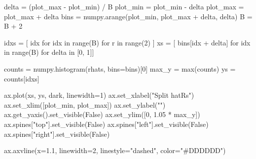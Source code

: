 \documentclass[
  letterpaper,
  DIV=11,
  numbers=noendperiod]{scrartcl}
\newenvironment{Shaded}{\begin{snugshade}}{\end{snugshade}}
\newcommand{\BuiltInTok}[1]{\textcolor[rgb]{0.00,0.23,0.31}{#1}}
\newcommand{\ControlFlowTok}[1]{\textcolor[rgb]{0.00,0.23,0.31}{#1}}
\newcommand{\DecValTok}[1]{\textcolor[rgb]{0.68,0.00,0.00}{#1}}
\newcommand{\FloatTok}[1]{\textcolor[rgb]{0.68,0.00,0.00}{#1}}
\newcommand{\KeywordTok}[1]{\textcolor[rgb]{0.00,0.23,0.31}{#1}}
\newcommand{\NormalTok}[1]{\textcolor[rgb]{0.00,0.23,0.31}{#1}}
\newcommand{\OperatorTok}[1]{\textcolor[rgb]{0.37,0.37,0.37}{#1}}
\newcommand{\StringTok}[1]{\textcolor[rgb]{0.13,0.47,0.30}{#1}}
\newcommand{\VariableTok}[1]{\textcolor[rgb]{0.07,0.07,0.07}{#1}}
\begin{document}
\begin{Shaded}
\begin{Highlighting}[]
\NormalTok{  delta }\OperatorTok{=}\NormalTok{ (plot\_max }\OperatorTok{{-}}\NormalTok{ plot\_min) }\OperatorTok{/}\NormalTok{ B}
\NormalTok{  plot\_min }\OperatorTok{=}\NormalTok{ plot\_min }\OperatorTok{{-}}\NormalTok{ delta}
\NormalTok{  plot\_max }\OperatorTok{=}\NormalTok{ plot\_max }\OperatorTok{+}\NormalTok{ delta}
\NormalTok{  bins }\OperatorTok{=}\NormalTok{ numpy.arange(plot\_min, plot\_max }\OperatorTok{+}\NormalTok{ delta, delta)}
\NormalTok{  B }\OperatorTok{=}\NormalTok{ B }\OperatorTok{+} \DecValTok{2}

\NormalTok{  idxs }\OperatorTok{=}\NormalTok{ [ idx }\ControlFlowTok{for}\NormalTok{ idx }\KeywordTok{in} \BuiltInTok{range}\NormalTok{(B) }\ControlFlowTok{for}\NormalTok{ r }\KeywordTok{in} \BuiltInTok{range}\NormalTok{(}\DecValTok{2}\NormalTok{) ]}
\NormalTok{  xs }\OperatorTok{=}\NormalTok{ [ bins[idx }\OperatorTok{+}\NormalTok{ delta] }\ControlFlowTok{for}\NormalTok{ idx }\KeywordTok{in} \BuiltInTok{range}\NormalTok{(B) }\ControlFlowTok{for}\NormalTok{ delta }\KeywordTok{in}\NormalTok{ [}\DecValTok{0}\NormalTok{, }\DecValTok{1}\NormalTok{]]}

\NormalTok{  counts }\OperatorTok{=}\NormalTok{ numpy.histogram(rhats, bins}\OperatorTok{=}\NormalTok{bins)[}\DecValTok{0}\NormalTok{]}
\NormalTok{  max\_y }\OperatorTok{=} \BuiltInTok{max}\NormalTok{(counts)}
\NormalTok{  ys }\OperatorTok{=}\NormalTok{ counts[idxs]}

\NormalTok{  ax.plot(xs, ys, dark, linewidth}\OperatorTok{=}\DecValTok{1}\NormalTok{)}
\NormalTok{  ax.set\_xlabel(}\StringTok{"Split hatRs"}\NormalTok{)}
\NormalTok{  ax.set\_xlim([plot\_min, plot\_max])}
\NormalTok{  ax.set\_ylabel(}\StringTok{""}\NormalTok{)}
\NormalTok{  ax.get\_yaxis().set\_visible(}\VariableTok{False}\NormalTok{)}
\NormalTok{  ax.set\_ylim([}\DecValTok{0}\NormalTok{, }\FloatTok{1.05} \OperatorTok{*}\NormalTok{ max\_y])}
\NormalTok{  ax.spines[}\StringTok{"top"}\NormalTok{].set\_visible(}\VariableTok{False}\NormalTok{)}
\NormalTok{  ax.spines[}\StringTok{"left"}\NormalTok{].set\_visible(}\VariableTok{False}\NormalTok{)}
\NormalTok{  ax.spines[}\StringTok{"right"}\NormalTok{].set\_visible(}\VariableTok{False}\NormalTok{)}

\NormalTok{  ax.axvline(x}\OperatorTok{=}\FloatTok{1.1}\NormalTok{, linewidth}\OperatorTok{=}\DecValTok{2}\NormalTok{, linestyle}\OperatorTok{=}\StringTok{"dashed"}\NormalTok{, color}\OperatorTok{=}\StringTok{"\#DDDDDD"}\NormalTok{)}
\end{Highlighting}
\end{Shaded}
\end{document}
